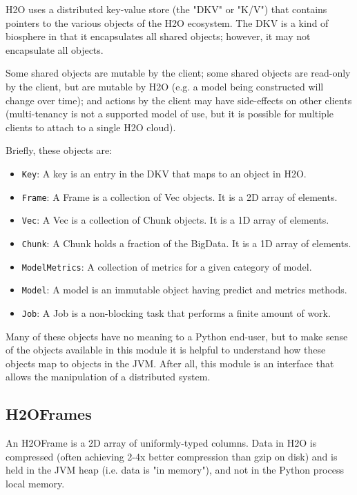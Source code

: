 H2O uses a distributed key-value store (the "DKV" or "K/V") that contains pointers to the various objects of the H2O ecosystem. The DKV is a kind of biosphere in that it encapsulates all shared objects; however, it may not encapsulate all objects. 

Some shared objects are mutable by the client; some shared objects are read-only by the client, but are mutable by H2O (e.g. a model being constructed will change over time); and actions by the client may have side-effects on other clients (multi-tenancy is not a supported model of use, but it is possible for multiple clients to attach to a single H2O cloud).

Briefly, these objects are:

\begin{itemize}
\item \texttt{Key}: A key is an entry in the DKV that maps to an object in H2O.
\item \texttt{Frame}: A Frame is a collection of Vec objects. It is a 2D array of elements.
\item \texttt{Vec}: A Vec is a collection of Chunk objects. It is a 1D array of elements.
\item \texttt{Chunk}: A Chunk holds a fraction of the BigData. It is a 1D array of elements.
\item \texttt{ModelMetrics}: A collection of metrics for a given category of model.
\item \texttt{Model}: A model is an immutable object having predict and metrics methods.
\item \texttt{Job}: A Job is a non-blocking task that performs a finite amount of work.
\end{itemize}
Many of these objects have no meaning to a Python end-user, but to make sense of the objects available in this module it is helpful to understand how these objects map to objects in the JVM. After all, this module is an interface that allows the manipulation of a distributed system.


\subsection{H2OFrames}

An H2OFrame is a 2D array of uniformly-typed columns. Data in H2O is compressed (often achieving 2-4x better compression than gzip on disk) and is held in the JVM heap (i.e. data is "in memory"), and not in the Python process local memory. 

